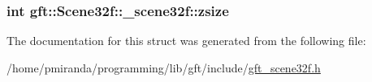 \subsubsection[{\texorpdfstring{zsize}{zsize}}]{\setlength{\rightskip}{0pt plus 5cm}int gft\+::\+Scene32f\+::\+\_\+scene32f\+::zsize}\hypertarget{structgft_1_1Scene32f_1_1__scene32f_a2edf3aef02f61feb5b316fc0ee3db854}{}\label{structgft_1_1Scene32f_1_1__scene32f_a2edf3aef02f61feb5b316fc0ee3db854}


The documentation for this struct was generated from the following file\+:\begin{DoxyCompactItemize}
\item 
/home/pmiranda/programming/lib/gft/include/\hyperlink{gft__scene32f_8h}{gft\+\_\+scene32f.\+h}\end{DoxyCompactItemize}
